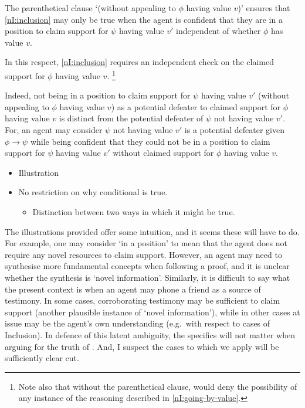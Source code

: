 \begin{note}
  The parenthetical clause `(without appealing to \(\phi\) having value \(v\))' ensures that \ref{nI:inclusion} may only be true when the agent is confident that they are in a position to claim support for \(\psi\) having value \(v'\) independent of whether \(\phi\) has value \(v\).

  In this respect, \ref{nI:inclusion} requires an independent check on the claimed support for \(\phi\) having value \(v\).\nolinebreak
  \footnote{
    Note also that without the parenthetical clause, \nI{} would deny the possibility of any instance of the reasoning described in \ref{nI:going-by-value}.
  }

  Indeed, not being in a position to claim support for \(\psi\) having value \(v'\) (without appealing to \(\phi\) having value \(v\)) as a potential defeater to claimed support for \(\phi\) having value \(v\) is distinct from the potential defeater of \(\psi\) not having value \(v'\).
  For, an agent may consider \(\psi\) not having value \(v'\) is a potential defeater given \(\phi \rightarrow \psi\) while being confident that they could not be in a position to claim support for \(\psi\) having value \(v'\) without claimed support for \(\phi\) having value \(v\).

  \begin{itemize}
  \item Illustration
  \item No restriction on why conditional is true.
    \begin{itemize}
    \item Distinction between two ways in which it might be true.
    \end{itemize}
  \end{itemize}
\end{note}

\begin{note}
  \color{red}
  The illustrations provided offer some intuition, and it seems these will have to do.
  For example, one may consider `in a position' to mean that the agent does not require any novel resources to claim support.
  However, an agent may need to synthesise more fundamental concepts when following a proof, and it is unclear whether the synthesis is `novel information'.
  Similarly, it is difficult to say what the present context is when an agent may phone a friend as a source of testimony.
  In some cases, corroborating testimony may be sufficient to claim support (another plausible instance of `novel information'), while in other cases at issue may be the agent's own understanding (e.g.\ with respect to cases of Inclusion).
  In defence of this latent ambiguity, the specifics will not matter when arguing for the truth of \nI{}.
  And, I suspect the cases to which we apply \nI{} will be sufficiently clear cut.
\end{note}

